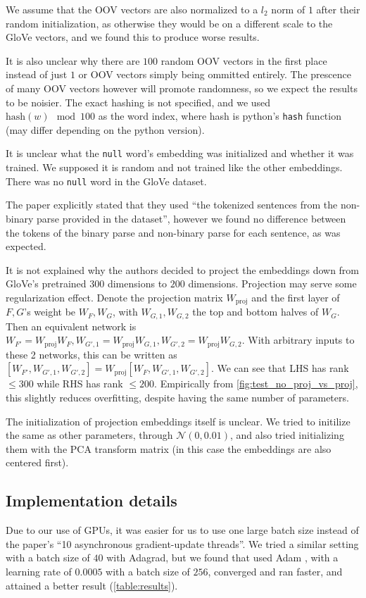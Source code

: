 \documentclass{article}
\begin{document}
We assume that the OOV vectors are also normalized to a $l_2$ norm of $1$ after their random initialization, as otherwise they would be on a different scale to the GloVe vectors, and we found this to produce worse results.

It is also unclear why there are $100$ random OOV vectors in the first place instead of just $1$ or OOV vectors simply being ommitted entirely. The prescence of many OOV vectors however will promote randomness, so we expect the results to be noisier. The exact hashing is not specified, and we used $\text{hash}(w) \mod 100$ as the word index, where hash is python's \texttt{hash} function (may differ depending on the python version).

It is unclear what the \texttt{null} word's embedding was initialized and whether it was trained. We supposed it is random and not trained like the other embeddings. There was no \texttt{null} word in the GloVe dataset.

The paper explicitly stated that they used ``the tokenized sentences from the non-binary parse provided in the dataset'', however we found no difference between the tokens of the binary parse and non-binary parse for each sentence, as was expected.

It is not explained why the authors decided to project the embeddings down from GloVe's pretrained $300$ dimensions to $200$ dimensions. Projection may serve some regularization effect. Denote the projection matrix $W_\text{proj}$ and the first layer of $F, G$'s weight be $W_F, W_G$, with $W_{G,1}, W_{G,2}$ the top and bottom halves of $W_G$. Then an equivalent network is $W_{F'} = W_\text{proj} W_F, W_{G',1} = W_\text{proj} W_{G,1}, W_{G',2} = W_\text{proj} W_{G,2}$. With arbitrary inputs to these 2 networks, this can be written as $[W_{F'}, W_{G',1}, W_{G',2}] = W_\text{proj} [W_F, W_{G',1}, W_{G',2}]$. We can see that LHS has rank $\le 300$ while RHS has rank $\le 200$. Empirically from \autoref{fig:test_no_proj_vs_proj}, this slightly reduces overfitting, despite having the same number of parameters.

The initialization of projection embeddings itself is unclear. We tried to initilize the same as other parameters, through $\mathcal{N}(0, 0.01)$, and also tried initializing them with the PCA transform matrix (in this case the embeddings are also centered first).

\subsection{Implementation details}
Due to our use of GPUs, it was easier for us to use one large batch size instead of the paper's ``10 asynchronous gradient-update threads''. We tried a similar setting with a batch size of $40$ with Adagrad, but we found that used Adam \citep{kingma_adam:_2014}, with a learning rate of $0.0005$ with a batch size of $256$, converged and ran faster, and attained a better result (\autoref{table:results}).
\end{document}
